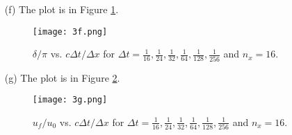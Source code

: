 \documentclass{article}
\begin{document}
\begin{enumerate}
\begin{enumerate}
\item[(f)]
The plot is in Figure \ref{Problem 3(f)}.

\begin{figure}[h]
\centering
\texttt{[image: 3f.png]}
\caption{$\delta/\pi$ vs. $c\Delta t/\Delta x$ for $\Delta t = \frac{1}{16}, \frac{1}{24}, \frac{1}{32}, \frac{1}{64}, \frac{1}{128}, \frac{1}{256}$ and $n_x = 16 $.}
\label{Problem 3(f)}
\end{figure}

\item[(g)]
The plot is in Figure \ref{Problem 3(g)}.

\begin{figure}[h]
\centering
\texttt{[image: 3g.png]}
\caption{$u_f/u_0 $ vs. $c\Delta t/\Delta x$ for $\Delta t = \frac{1}{16}, \frac{1}{24}, \frac{1}{32}, \frac{1}{64}, \frac{1}{128}, \frac{1}{256}$ and $n_x = 16 $.}
\label{Problem 3(g)}
\end{figure}

\end{enumerate}

\end{enumerate}
\end{document}
